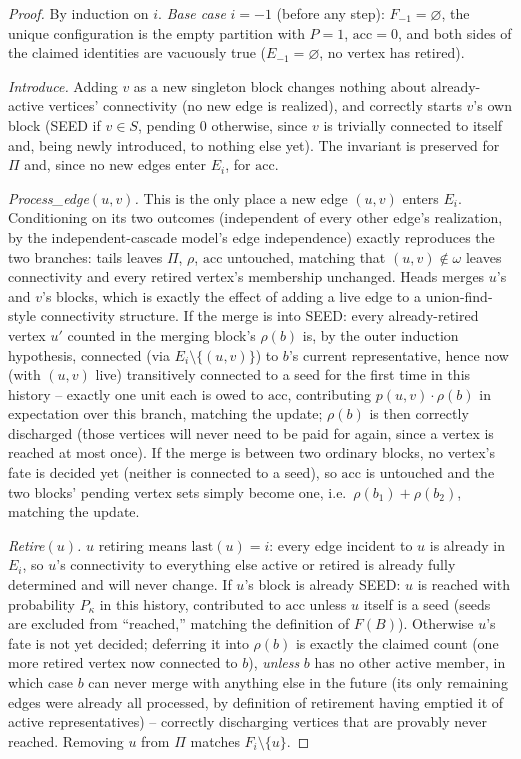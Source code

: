 \documentclass[ASNA,number]{USG}
\newcommand{\FF}{F}
\begin{document}
\begin{proof}
By induction on $i$. \emph{Base case} $i=-1$ (before any step): $F_{-1}
=\varnothing$, the unique configuration is the empty partition with $P=1$,
$\mathrm{acc}=0$, and both sides of the claimed identities are vacuously
true ($E_{-1}=\varnothing$, no vertex has retired).

\emph{Introduce.} Adding $v$ as a new singleton block changes nothing about
already-active vertices' connectivity (no new edge is realized), and
correctly starts $v$'s own block (SEED if $v\in S$, pending $0$ otherwise,
since $v$ is trivially connected to itself and, being newly introduced, to
nothing else yet). The invariant is preserved for $\Pi$ and, since no new
edges enter $E_i$, for $\mathrm{acc}$.

\emph{Process\_edge$(u,v)$.} This is the only place a new edge $(u,v)$
enters $E_i$. Conditioning on its two outcomes (independent of every other
edge's realization, by the independent-cascade model's edge independence)
exactly reproduces the two branches: tails leaves $\Pi$, $\rho$,
$\mathrm{acc}$ untouched, matching that $(u,v)\notin\omega$ leaves
connectivity and every retired vertex's membership unchanged. Heads merges
$u$'s and $v$'s blocks, which is exactly the effect of adding a live edge to
a union-find-style connectivity structure. If the merge is into SEED: every
already-retired vertex $u'$ counted in the merging block's $\rho(b)$ is, by
the outer induction hypothesis, connected (via $E_i\setminus\{(u,v)\}$) to
$b$'s current representative, hence now (with $(u,v)$ live) transitively
connected to a seed for the first time in this history -- exactly one unit
each is owed to $\mathrm{acc}$, contributing $p(u,v)\cdot\rho(b)$ in
expectation over this branch, matching the update; $\rho(b)$ is then
correctly discharged (those vertices will never need to be paid for again,
since a vertex is reached at most once). If the merge is between two
ordinary blocks, no vertex's fate is decided yet (neither is connected to a
seed), so $\mathrm{acc}$ is untouched and the two blocks' pending vertex
sets simply become one, i.e.\ $\rho(b_1)+\rho(b_2)$, matching the update.

\emph{Retire$(u)$.} $u$ retiring means $\mathrm{last}(u)=i$: every edge
incident to $u$ is already in $E_i$, so $u$'s connectivity to everything
else active or retired is already fully determined and will never change.
If $u$'s block is already SEED: $u$ is reached with probability $P_\kappa$
in this history, contributed to $\mathrm{acc}$ unless $u$ itself is a seed
(seeds are excluded from ``reached,'' matching the definition of
$\FF(B)$). Otherwise $u$'s fate is not yet decided; deferring it into
$\rho(b)$ is exactly the claimed count (one more retired vertex now
connected to $b$), \emph{unless} $b$ has no other active member, in which
case $b$ can never merge with anything else in the future (its only
remaining edges were already all processed, by definition of retirement
having emptied it of active representatives) -- correctly discharging
vertices that are provably never reached. Removing $u$ from $\Pi$ matches
$F_i\setminus\{u\}$.
\end{proof}
\end{document}
